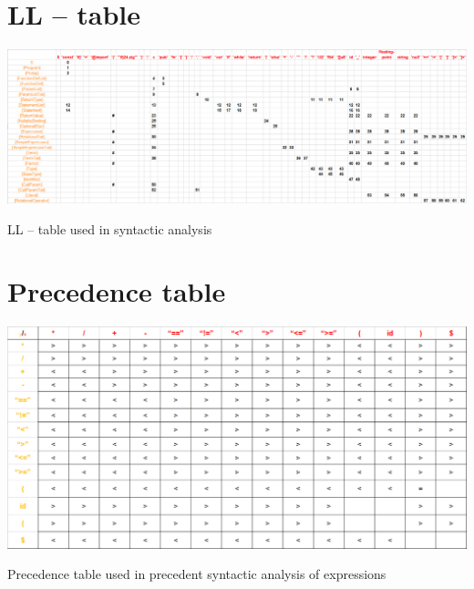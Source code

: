 \documentclass[a4paper, 11pt]{article}
\begin{document}
	\begin{table}[!ht]
        \section{LL -- table}
		\centering
		\includegraphics[width=1\linewidth]{LL_table.pdf}
		\caption{LL -- table used in syntactic analysis}
		\label{table:ll_table}
	\end{table}


	
	\begin{table}[!ht]
        \section{Precedence table}
		\centering
		\includegraphics[width=0.7\linewidth]{Precedence_table.pdf}
		\caption{Precedence table used in precedent syntactic analysis of expressions}
		\label{table:Precedence table}
	\end{table}
\end{document}
